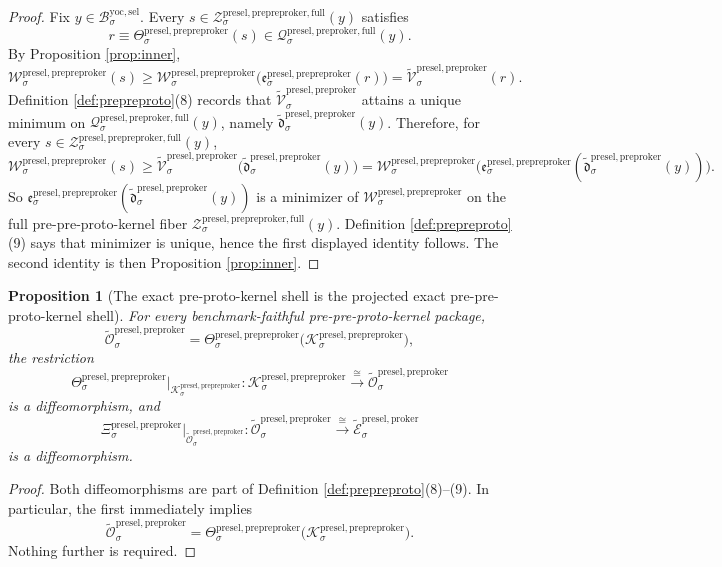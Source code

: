 \documentclass[11pt]{article}
\newcommand{\YoctoSelectorBody}[1]{\mathcal B_{#1}^{\mathrm{yoc,sel}}}
\newcommand{\PreProtoKernelProj}[1]{\Xi_{#1}^{\mathrm{presel,preproker}}}
\newcommand{\PreProtoKernelFullFiber}[2]{\mathcal Q_{#1}^{\mathrm{presel,preproker,full}}(#2)}
\newcommand{\PrePreProtoKernelProj}[1]{\Theta_{#1}^{\mathrm{presel,prepreproker}}}
\newcommand{\PrePreProtoKernelFunctional}[1]{\mathscr W_{#1}^{\mathrm{presel,prepreproker}}}
\newcommand{\PrePreProtoKernelMinLift}[1]{\mathfrak e_{#1}^{\mathrm{presel,prepreproker}}}
\newcommand{\PrePreProtoKernelFullFiber}[2]{\mathcal Z_{#1}^{\mathrm{presel,prepreproker,full}}(#2)}
\newcommand{\PrePreProtoKernelShell}[1]{\mathcal K_{#1}^{\mathrm{presel,prepreproker}}}
\newcommand{\InducedProtoKernelShell}[1]{\widetilde{\mathcal E}_{#1}^{\mathrm{presel,proker}}}
\newcommand{\InducedPreProtoKernelFunctional}[1]{\widetilde{\mathscr V}_{#1}^{\mathrm{presel,preproker}}}
\newcommand{\InducedPreProtoKernelFullMin}[1]{\widetilde{\mathfrak d}_{#1}^{\mathrm{presel,preproker}}}
\newcommand{\InducedPreProtoKernelShell}[1]{\widetilde{\mathcal O}_{#1}^{\mathrm{presel,preproker}}}
\newtheorem{proposition}{Proposition}
\begin{document}
\begin{proof}
Fix \(y\in\YoctoSelectorBody{\sigma}\). Every \(s\in\PrePreProtoKernelFullFiber{\sigma}{y}\) satisfies
\[
r\equiv\PrePreProtoKernelProj{\sigma}(s)\in\PreProtoKernelFullFiber{\sigma}{y}.
\]
By Proposition \ref{prop:inner},
\[
\PrePreProtoKernelFunctional{\sigma}(s)
\geq
\PrePreProtoKernelFunctional{\sigma}\bigl(\PrePreProtoKernelMinLift{\sigma}(r)\bigr)
=
\InducedPreProtoKernelFunctional{\sigma}(r).
\]
Definition \ref{def:prepreproto}(8) records that \(\InducedPreProtoKernelFunctional{\sigma}\) attains a unique minimum on \(\PreProtoKernelFullFiber{\sigma}{y}\), namely \(\InducedPreProtoKernelFullMin{\sigma}(y)\). Therefore, for every \(s\in\PrePreProtoKernelFullFiber{\sigma}{y}\),
\[
\PrePreProtoKernelFunctional{\sigma}(s)
\geq
\InducedPreProtoKernelFunctional{\sigma}\bigl(\InducedPreProtoKernelFullMin{\sigma}(y)\bigr)
=
\PrePreProtoKernelFunctional{\sigma}\bigl(\PrePreProtoKernelMinLift{\sigma}(\InducedPreProtoKernelFullMin{\sigma}(y))\bigr).
\]
So \(\PrePreProtoKernelMinLift{\sigma}(\InducedPreProtoKernelFullMin{\sigma}(y))\) is a minimizer of \(\PrePreProtoKernelFunctional{\sigma}\) on the full pre-pre-proto-kernel fiber \(\PrePreProtoKernelFullFiber{\sigma}{y}\). Definition \ref{def:prepreproto}(9) says that minimizer is unique, hence the first displayed identity follows. The second identity is then Proposition \ref{prop:inner}.
\end{proof}

\begin{proposition}[The exact pre-proto-kernel shell is the projected exact pre-pre-proto-kernel shell]
\label{prop:shell}
For every benchmark-faithful pre-pre-proto-kernel package,
\[
\InducedPreProtoKernelShell{\sigma}
=
\PrePreProtoKernelProj{\sigma}\bigl(\PrePreProtoKernelShell{\sigma}\bigr),
\]
the restriction
\[
\PrePreProtoKernelProj{\sigma}\big|_{\PrePreProtoKernelShell{\sigma}}
:
\PrePreProtoKernelShell{\sigma}\xrightarrow{\cong}\InducedPreProtoKernelShell{\sigma}
\]
is a diffeomorphism, and
\[
\PreProtoKernelProj{\sigma}\big|_{\InducedPreProtoKernelShell{\sigma}}
:
\InducedPreProtoKernelShell{\sigma}\xrightarrow{\cong}\InducedProtoKernelShell{\sigma}
\]
is a diffeomorphism.
\end{proposition}

\begin{proof}
Both diffeomorphisms are part of Definition \ref{def:prepreproto}(8)--(9). In particular, the first immediately implies
\[
\InducedPreProtoKernelShell{\sigma}
=
\PrePreProtoKernelProj{\sigma}\bigl(\PrePreProtoKernelShell{\sigma}\bigr).
\]
Nothing further is required.
\end{proof}
\end{document}
